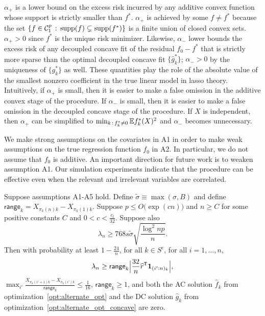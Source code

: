 $\alpha_+$ is a lower bound on the excess risk incurred by any additive convex function whose support is strictly smaller than $f^*$. $\alpha_+$ is achieved by some $f \neq f^*$ because the set $\{f\in \mathcal{C}_1^p\,:\, \textrm{supp}(f) \subsetneq \textrm{supp}(f^*)\}$ is a finite union of closed convex sets. $\alpha_+ > 0$ since $f^*$ is the unique risk minimizer. Likewise, $\alpha_-$ lower bounds the excess risk of any decoupled concave fit of the residual $f_0 - f^*$ that is strictly more sparse than the optimal decoupled concave fit $\{\hat{g}_k^*\}$; $\alpha_- > 0$ by the uniqueness of $\{g^*_k\}$ as well. These quantities play the role of the absolute value of the smallest nonzero coefficient in the true linear model in lasso theory.  Intuitively, if
$\alpha_{+}$ is small, then it is easier to make a false omission in the
additive convex stage of the procedure. If $\alpha_{-}$ is small, then
it is easier to make a false omission in the decoupled concave stage
of the procedure. If $X$ is independent, then $\alpha_+$ can be simplified to $\min_{k \,:\, f^*_k \neq 0} {\mathbb E} f^*_k(X)^2$ and $\alpha_-$ becomes unnecessary.

\begin{remark}
  We make strong assumptions on the covariates in A1 in order to make
  weak assumptions on the true regression function $f_0$ in
  A2. In particular, we do not assume that $f_0$ is additive. An
  important direction for future work is to weaken assumption A1.
  Our simulation experiments indicate that the procedure can be
  effective even when the relevant and irrelevant variables are correlated.
\end{remark}


\begin{theorem}
\label{thm:false_positive}
Suppose assumptions A1-A5 hold. Define $\tilde{\sigma} \equiv \max(\sigma, B)$ and define $\mathsf{range}_k = X_{\pi_k(n)k} - X_{\pi_k(1)k}$. Suppose $p \leq O\big( \exp(c n) \big)$ and $n \geq C$ for some positive constants $C$ and $0 < c < \frac{c_l}{32}$.  Suppose also
\begin{equation}
\lambda_n \geq 768 s \tilde{\sigma}  \sqrt{ \frac{\log^2 np}{n}}.
\end{equation}  
Then with probability at least $ 1 - \frac{24}{n}$, for all $k \in
S^c$, for all $i=1,\ldots,n$,
\begin{equation}
\lambda_n \geq \mathsf{range}_k \Big| \frac{32}{n}\widehat{r}^{\mathsf{T}} \mbox{\boldmath $1$}_{(i':n)_k} \Big| ,
\end{equation}
$\max_{i'} \frac{X_{\pi_k(i'+1)k} - X_{\pi_k(i')k}}{\mathsf{range}_k} \leq \frac{1}{16}$, $\mathsf{range}_k \geq 1$, and both the AC solution $\hat{f}_k$ from optimization~\eqref{opt:alternate_opt} and the DC solution $\hat{g}_k$ from optimization~\eqref{opt:alternate_opt_concave} are zero. 
\end{theorem}

